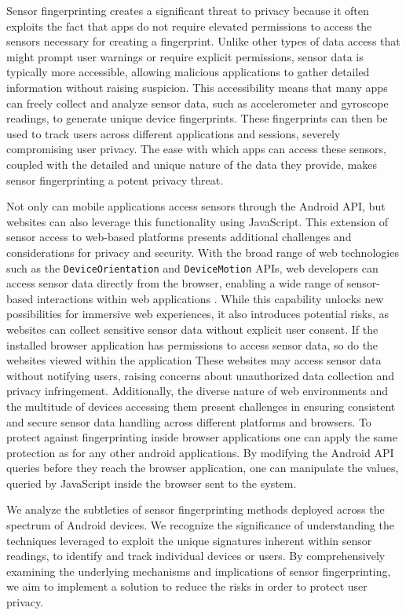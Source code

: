 \documentclass[11pt,
  oneside,openany,    %
]{scrreprt}
\begin{document}
Sensor fingerprinting creates a significant threat to privacy because it often exploits the fact that apps do not require elevated permissions to access the sensors necessary for creating a fingerprint.
Unlike other types of data access that might prompt user warnings or require explicit permissions, sensor data is typically more accessible, allowing malicious applications to gather detailed information without raising suspicion. 
This accessibility means that many apps can freely collect and analyze sensor data, such as accelerometer and gyroscope readings, to generate unique device fingerprints.
These fingerprints can then be used to track users across different applications and sessions, severely compromising user privacy.
The ease with which apps can access these sensors, coupled with the detailed and unique nature of the data they provide, makes sensor fingerprinting a potent privacy threat.

Not only can mobile applications access sensors through the Android API, but websites can also leverage this functionality using JavaScript.
This extension of sensor access to web-based platforms presents additional challenges and considerations for privacy and security.
With the broad range of web technologies such as the \verb|DeviceOrientation| and \verb|DeviceMotion| APIs, web developers can access sensor data directly from the browser, enabling a wide range of sensor-based interactions within web applications \cite{DBLP:journals/popets/DasBC18}.
While this capability unlocks new possibilities for immersive web experiences, it also introduces potential risks, as websites can collect sensitive sensor data without explicit user consent.
If the installed browser application has permissions to access sensor data, so do the websites viewed within the application
These websites may access sensor data without notifying users, raising concerns about unauthorized data collection and privacy infringement.
Additionally, the diverse nature of web environments and the multitude of devices accessing them present challenges in ensuring consistent and secure sensor data handling across different platforms and browsers.
To protect against fingerprinting inside browser applications one can apply the same protection as for any other android applications.
By modifying the Android API queries before they reach the browser application, one can manipulate the values, queried by JavaScript inside the browser sent to the system.

We analyze the subtleties of sensor fingerprinting methods deployed across the spectrum of Android devices. 
We recognize the significance of understanding the techniques leveraged to exploit the unique signatures inherent within sensor readings, to identify and track individual devices or users. 
By comprehensively examining the underlying mechanisms and implications of sensor fingerprinting, we aim to implement a solution to reduce the risks in order to protect user privacy.
\end{document}
